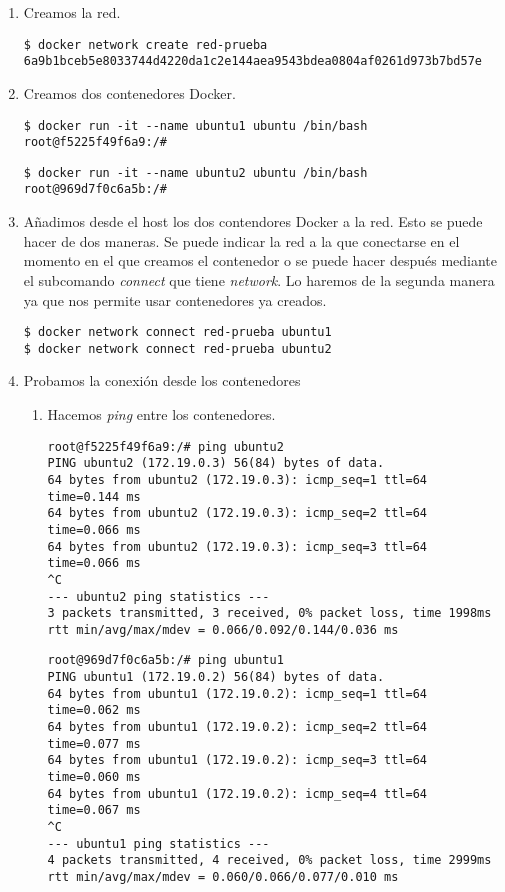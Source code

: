 	\begin{enumerate}
		\item Creamos la red.
		\begin{lstlisting}[style=consola]
$ docker network create red-prueba
6a9b1bceb5e8033744d4220da1c2e144aea9543bdea0804af0261d973b7bd57e
		\end{lstlisting}
	
		\item Creamos dos contenedores Docker.
		\begin{lstlisting}[style=consola]
$ docker run -it --name ubuntu1 ubuntu /bin/bash
root@f5225f49f6a9:/# 
		\end{lstlisting}
		\begin{lstlisting}[style=consola]
$ docker run -it --name ubuntu2 ubuntu /bin/bash
root@969d7f0c6a5b:/# 
		\end{lstlisting}
		
		\item Añadimos desde el host los dos contendores Docker a la red. Esto se puede hacer de dos maneras. Se puede indicar la red a la que conectarse en el momento en el que creamos el contenedor o se puede hacer después mediante el subcomando \emph{connect} que tiene \emph{network}. Lo haremos de la segunda manera ya que nos permite usar contenedores ya creados.
		\begin{lstlisting}[style=consola]
$ docker network connect red-prueba ubuntu1
$ docker network connect red-prueba ubuntu2 
		\end{lstlisting}
		
		\item Probamos la conexión desde los contenedores
		\begin{enumerate}
			\item Hacemos \textit{ping} entre los contenedores.
			\begin{lstlisting}[style=consola]
root@f5225f49f6a9:/# ping ubuntu2
PING ubuntu2 (172.19.0.3) 56(84) bytes of data.
64 bytes from ubuntu2 (172.19.0.3): icmp_seq=1 ttl=64 time=0.144 ms
64 bytes from ubuntu2 (172.19.0.3): icmp_seq=2 ttl=64 time=0.066 ms
64 bytes from ubuntu2 (172.19.0.3): icmp_seq=3 ttl=64 time=0.066 ms
^C
--- ubuntu2 ping statistics ---
3 packets transmitted, 3 received, 0% packet loss, time 1998ms
rtt min/avg/max/mdev = 0.066/0.092/0.144/0.036 ms
			\end{lstlisting}
			\begin{lstlisting}[style=consola]
root@969d7f0c6a5b:/# ping ubuntu1
PING ubuntu1 (172.19.0.2) 56(84) bytes of data.
64 bytes from ubuntu1 (172.19.0.2): icmp_seq=1 ttl=64 time=0.062 ms
64 bytes from ubuntu1 (172.19.0.2): icmp_seq=2 ttl=64 time=0.077 ms
64 bytes from ubuntu1 (172.19.0.2): icmp_seq=3 ttl=64 time=0.060 ms
64 bytes from ubuntu1 (172.19.0.2): icmp_seq=4 ttl=64 time=0.067 ms
^C
--- ubuntu1 ping statistics ---
4 packets transmitted, 4 received, 0% packet loss, time 2999ms
rtt min/avg/max/mdev = 0.060/0.066/0.077/0.010 ms
			\end{lstlisting}
			

\end{enumerate}
\end{enumerate}
